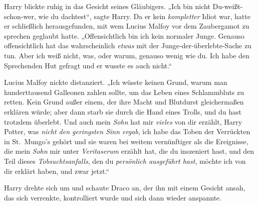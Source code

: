 Harry blickte ruhig in das Gesicht seines Gläubigers.
„Ich bin nicht Du-weißt-schon-wer, wie du dachtest“, sagte Harry. Da er kein \emph{kompletter} Idiot war, hatte er schließlich herausgefunden, mit wem Lucius Malfoy vor dem Zaubergamot zu sprechen geglaubt hatte. „Offensichtlich bin ich kein normaler Junge. Genauso offensichtlich hat das wahrscheinlich \emph{etwas} mit der Junge-der-überlebte-Sache zu tun. Aber ich weiß nicht, was, oder warum, genauso wenig wie du. Ich habe den Sprechenden Hut gefragt und er wusste es auch nicht.“

Lucius Malfoy nickte distanziert.
„Ich wüsste keinen Grund, warum man hunderttausend Galleonen zahlen sollte, um das Leben eines Schlammbluts zu retten. Kein Grund außer einem, der ihre Macht und Blutdurst gleichermaßen erklären würde; aber dann starb sie durch die Hand eines Trolls, und du hast trotzdem überlebt. Und auch mein \emph{Sohn} hat mir \emph{vieles} von dir erzählt, Harry Potter, was \emph{nicht den geringsten Sinn ergab}, ich habe das Toben der Verrückten in St.~Mungo’s gehört und sie waren bei weitem vernünftiger als die Ereignisse, die mein \emph{Sohn} mir unter \emph{Veritaserum} erzählt hat, die du inszeniert hast, und den Teil dieses \emph{Tobsuchtsanfalls}, den du \emph{persönlich ausgeführt hast}, möchte ich von dir erklärt haben, und zwar jetzt.“

Harry drehte sich um und schaute Draco an, der ihn mit einem Gesicht ansah, das sich verrenkte, kontrolliert wurde und sich dann wieder anspannte.

